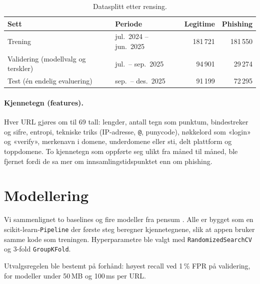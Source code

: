 \documentclass[11pt,a4paper]{article}
\newcommand{\code}[1]{\texttt{#1}}
\begin{document}
\begin{table}[H]
\centering
\small
\caption{Datasplitt etter rensing.}\label{tab:splitt}
\begin{tabular}{llrr}
\toprule
Sett & Periode & Legitime & Phishing \\
\midrule
Trening & jul.\ 2024 -- jun.\ 2025 & 181\,721 & 181\,550 \\
Validering (modellvalg og terskler) & jul.\ -- sep.\ 2025 & 94\,901 & 29\,274 \\
Test (én endelig evaluering) & sep.\ -- des.\ 2025 & 91\,199 & 72\,295 \\
\bottomrule
\end{tabular}
\end{table}

\paragraph{Kjennetegn (features).} Hver URL gjøres om til 69 tall: lengder, antall tegn som punktum, bindestreker og sifre, entropi, tekniske triks (IP-adresse, \code{@}, punycode), nøkkelord som «login» og «verify», merkenavn i domene, underdomene eller sti, delt plattform og toppdomene. To kjennetegn som oppførte seg ulikt fra måned til måned, ble fjernet fordi de sa mer om innsamlingstidspunktet enn om phishing.

\section{Modellering}

Vi sammenlignet to baselines og fire modeller fra pensum \cite{geron}. Alle er bygget som en scikit-learn-\code{Pipeline} \cite{sklearn} der første steg beregner kjennetegnene, slik at appen bruker samme kode som treningen. Hyperparametre ble valgt med \code{RandomizedSearchCV} og 3-fold \code{GroupKFold}.

Utvalgsregelen ble bestemt på forhånd: høyest recall ved 1\,\% FPR på validering, for modeller under 50\,MB og 100\,ms per URL.
\end{document}

